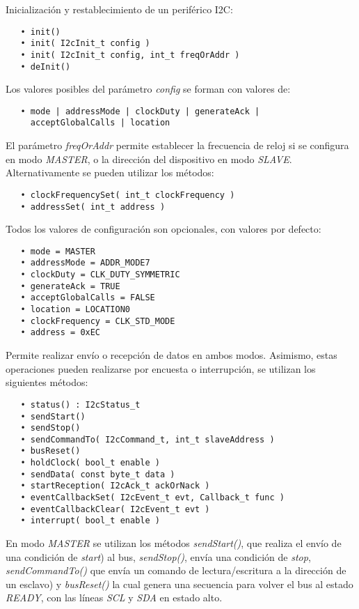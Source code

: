 
Inicialización y restablecimiento de un periférico I2C:

\begin{verbatim}
   • init()
   • init( I2cInit_t config )
   • init( I2cInit_t config, int_t freqOrAddr )
   • deInit()
\end{verbatim}

Los valores posibles del parámetro \emph{config} se forman con valores de:

\begin{verbatim}
   • mode | addressMode | clockDuty | generateAck |
     acceptGlobalCalls | location
\end{verbatim}

El parámetro \emph{freqOrAddr} permite establecer la frecuencia de reloj si se configura en modo \emph{MASTER}, o la dirección del dispositivo en modo \emph{SLAVE}. Alternativamente se pueden utilizar los métodos:

\begin{verbatim}
   • clockFrequencySet( int_t clockFrequency )
   • addressSet( int_t address )
\end{verbatim}

Todos los valores de configuración son opcionales, con valores por defecto:

\begin{verbatim}
   • mode = MASTER
   • addressMode = ADDR_MODE7
   • clockDuty = CLK_DUTY_SYMMETRIC
   • generateAck = TRUE
   • acceptGlobalCalls = FALSE
   • location = LOCATION0
   • clockFrequency = CLK_STD_MODE
   • address = 0xEC
\end{verbatim}

Permite realizar envío o recepción de datos en ambos modos. Asimismo, estas operaciones pueden realizarse por encuesta o interrupción, se utilizan los siguientes métodos:

\begin{verbatim}
   • status() : I2cStatus_t
   • sendStart()
   • sendStop()
   • sendCommandTo( I2cCommand_t, int_t slaveAddress )
   • busReset()
   • holdClock( bool_t enable )
   • sendData( const byte_t data )
   • startReception( I2cAck_t ackOrNack )
   • eventCallbackSet( I2cEvent_t evt, Callback_t func )
   • eventCallbackClear( I2cEvent_t evt )
   • interrupt( bool_t enable )
\end{verbatim}

En modo \emph{MASTER} se utilizan los métodos \emph{sendStart()}, que realiza el envío de una condición de \emph{start}) al bus, \emph{sendStop()}, envía una condición de \emph{stop}, \emph{sendCommandTo()} que envía un comando de lectura/escritura a la dirección de un esclavo) y \emph{busReset()} la cual genera una secuencia para volver el bus al estado \emph{READY}, con las líneas \emph{SCL} y \emph{SDA} en estado alto.


